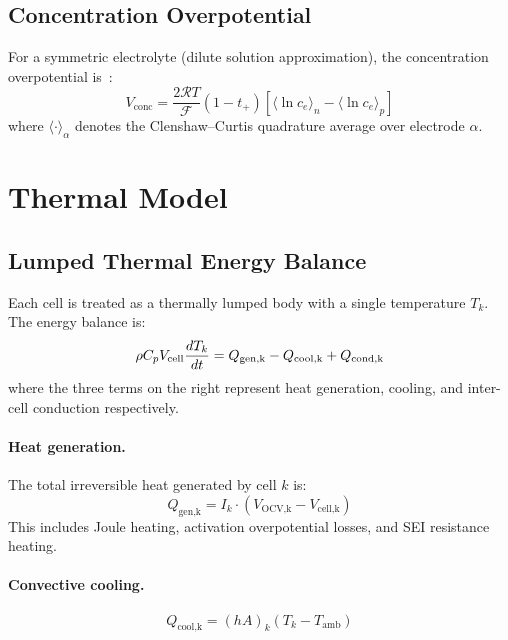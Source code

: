 \subsection{Concentration Overpotential}

For a symmetric electrolyte (dilute solution approximation), the concentration overpotential is~\cite{Newman2004}:
\begin{equation}
  V_\text{conc} = \frac{2\mathcal{R}T}{\mathcal{F}}(1-t_+)\left[\langle\ln c_e\rangle_n - \langle\ln c_e\rangle_p\right]
  \label{eq:V_conc}
\end{equation}
where $\langle\cdot\rangle_\alpha$ denotes the Clenshaw--Curtis quadrature average over electrode $\alpha$.

\section{Thermal Model}
\label{sec:thermal_model}

\subsection{Lumped Thermal Energy Balance}

Each cell is treated as a thermally lumped body with a single temperature $T_k$. The energy balance is:
\begin{equation}
  \rho C_p V_\text{cell} \dfrac{d T_k}{dt} = Q_\text{gen,k} - Q_\text{cool,k} + Q_\text{cond,k}
  \label{eq:thermal_ode}
\end{equation}
where the three terms on the right represent heat generation, cooling, and inter-cell conduction respectively.

\paragraph{Heat generation.} The total irreversible heat generated by cell $k$ is:
\begin{equation}
  Q_\text{gen,k} = I_k \cdot (V_\text{OCV,k} - V_\text{cell,k})
  \label{eq:Q_gen}
\end{equation}
This includes Joule heating, activation overpotential losses, and SEI resistance heating.

\paragraph{Convective cooling.}
\begin{equation}
  Q_\text{cool,k} = (hA)_k (T_k - T_\text{amb})
  \label{eq:Q_cool}
\end{equation}

